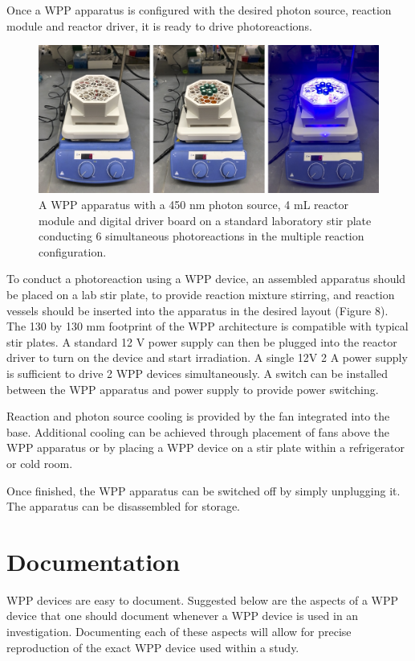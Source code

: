 \documentclass[11pt]{article}
\let\stdsection\section
\renewcommand\section{\clearpage\stdsection}
\begin{document}
Once a WPP apparatus is configured with the desired photon source, reaction module and reactor driver, it is ready to drive photoreactions.

\begin{figure}[H]
  \centering
  \includegraphics[width=\textwidth]{"./fign8.png"}
  \caption{A WPP apparatus with a 450 nm photon source, 4 mL reactor module and digital driver board on a standard laboratory stir plate conducting 6 simultaneous photoreactions in the multiple reaction configuration.}
\end{figure}

To conduct a photoreaction using a WPP device, an assembled apparatus should be placed on a lab stir plate, to provide reaction mixture stirring, and reaction vessels should be inserted into the apparatus in the desired layout (Figure 8).
The 130 by 130 mm footprint of the WPP architecture is compatible with typical stir plates.
A standard 12 V power supply can then be plugged into the reactor driver to turn on the device and start irradiation.
A single 12V 2 A power supply is sufficient to drive 2 WPP devices simultaneously.
A switch can be installed between the WPP apparatus and power supply to provide power switching.

Reaction and photon source cooling is provided by the fan integrated into the base.
Additional cooling can be achieved through placement of fans above the WPP apparatus or by placing a WPP device on a stir plate within a refrigerator or cold room.

Once finished, the WPP apparatus can be switched off by simply unplugging it. The apparatus can be disassembled for storage.

\section{Documentation}

WPP devices are easy to document.
Suggested below are the aspects of a WPP device that one should document whenever a WPP device is used in an investigation. 
Documenting each of these aspects will allow for precise reproduction of the exact WPP device used within a study. 
\end{document}
